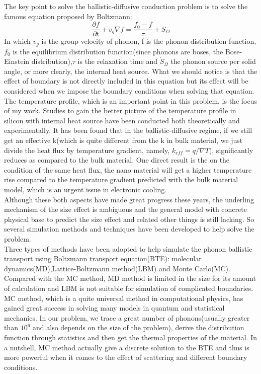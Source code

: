 The key point to solve the ballistic-diffusive conduction problem is to solve the famous equation proposed by Boltzmann\cite{Bolt}:
\begin{equation} 
\frac{\partial f}{\partial t} + v_g \nabla f = \frac{f_0 - f}{\tau} + \dot{S}_{\Omega} \label{con:Boltz}
\end{equation}
In which $v_g$ is the group velocity of phonon, f is the phonon distribution function, $f_0$ is the equilibrium distribution function(since phonons are boses, the Bose-Einstein distribution\cite{chandler}),$\tau$ is the relaxation time and $\dot{S}_{\Omega}$ the phonon source per solid angle\cite{hua3}, or more clearly, the internal heat source. What we should notice is that the effect of boundary is not directly included in this equation but its effect will be considered when we impose the boundary conditions when solving that equation.\\
\indent The temperature profile, which is an important point in this problem, is the focus of my work. Studies to gain the better picture of the temperature profile in silicon with internal heat source have been conducted both theoretically\cite{Lu,Amon} and experimentally\cite{Li,hsiao2013observation,Jo}. It has been found that in the ballistic-diffusive regime, if we still get an effective k(which is quite different from the k in bulk material, we just divide the heat flux by temperature gradient, namely, $k_{eff}=q/\nabla T$), significantly reduces as compared to the bulk material. One direct result is the on the condition of the same heat flux, the nano material will get a higher temperature rise compared to the temperature gradient predicted with the bulk material model, which is an urgent issue in electronic cooling.\\ \indent Although these both aspects have made great progress these years, the underling mechanism of the size effect is ambiguous and the general model with concrete physical base to predict the size effect and related other things is still lacking. So several simulation methods and techniques have been developed to help solve the problem.\\
\indent Three types of methods have been adopted to help simulate the phonon ballistic transport using Boltzmann transport equation(BTE): molecular dynamics(MD)\cite{MD},Lattice-Boltzmann method(LBM)\cite{LB} and Monte Carlo(MC)\cite{KL}. Compared with the MC method, MD method is limited in the size for its amount of calculation
and LBM is not suitable for simulation of complicated boundaries. MC method, which is a quite universal method in computational physics, has gained great success in solving many models in quantum and statistical mechanics\cite{Lan}. In our problem, we trace a great number of phonons(usually greater than $10^6$ and also depends on the size of the problem), derive the distribution function through statistics and then get the thermal properties of the material. In a nutshell, MC method actually give a discrete solution to the BTE and thus is more powerful when it comes to the effect of scattering and different boundary conditions.\\
